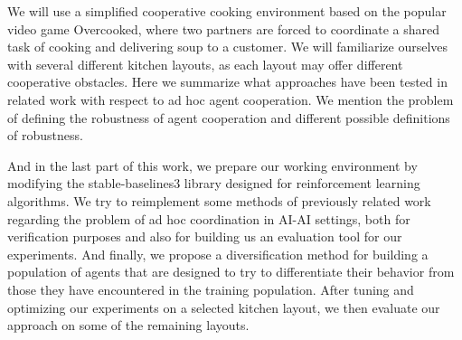 We will use a simplified cooperative cooking environment based on the popular video game Overcooked, where two partners are forced to coordinate a shared task of cooking and delivering soup to a customer.
We will familiarize ourselves with several different kitchen layouts, as each layout may offer different cooperative obstacles.
Here we summarize what approaches have been tested in related work with respect to ad hoc agent cooperation.
We mention the problem of defining the robustness of agent cooperation and different possible definitions of robustness.

And in the last part of this work, we prepare our working environment by modifying the stable-baselines3 library designed for reinforcement learning algorithms.
We try to reimplement some methods of previously related work regarding the problem of ad hoc coordination in AI-AI settings, both for verification purposes and also for building us an evaluation tool for our experiments.
And finally, we propose a diversification method for building a population of agents that are designed to try to differentiate their behavior from those they have encountered in the training population.
After tuning and optimizing our experiments on a selected kitchen layout, we then evaluate our approach on some of the remaining layouts.
